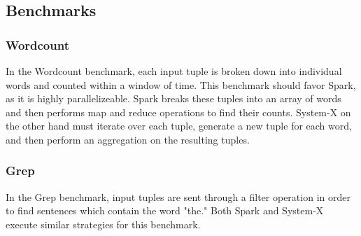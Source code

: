 \subsection{Benchmarks}

\subsubsection{Wordcount}
In the Wordcount benchmark, each input tuple is broken down into individual words and counted within a window of time.  This benchmark should favor Spark, as it is highly parallelizeable.   Spark breaks these tuples into an array of words and then performs map and reduce operations to find their counts.  System-X on the other hand must iterate over each tuple, generate a new tuple for each word, and then perform an aggregation on the resulting tuples.


\subsubsection{Grep}
In the Grep benchmark, input tuples are sent through a filter operation in order to find sentences which contain the word "the."  Both Spark and System-X execute similar strategies for this benchmark.

